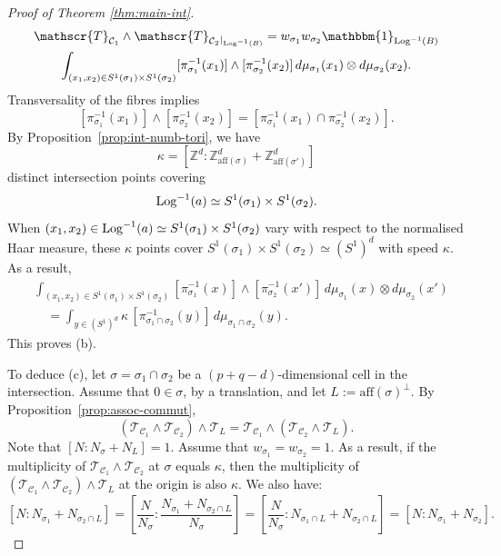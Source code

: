 \documentclass[11pt]{amsart}
\def\Log{{\rm Log}}
\theoremstyle{definition}
\newcommand{\Z}{\mathbb{Z}}
\newcommand{\cC}{\mathcal{C}}
\newcommand{\sT}{\mathscr{T}}
\begin{document}
\begin{proof}[Proof of Theorem \ref{thm:main-int}]
\begin{multline*}
\sT_{\cC_1} \wedge \sT_{\cC_2}{_{|_{\Log^{-1}(B)}}} = w_{\sigma_1} w_{\sigma_2} \mathbbm{1}_{\Log^{-1}(B)} \\ \int_{(x_1,x_2)\in S^1(\sigma_1)\times S^1(\sigma_2)}[\pi_{\sigma_1}^{-1}(x_1)] \wedge [\pi_{\sigma_2}^{-1}(x_2)]\, d\mu_{\sigma_1}(x_1) \otimes d \mu_{\sigma_2}(x_2).
\end{multline*}
Transversality of the fibres implies
$$
[\pi_{\sigma_1}^{-1}(x_1)] \wedge [\pi_{\sigma_2}^{-1}(x_2)] = [\pi_{\sigma_1}^{-1}(x_1) \cap \pi_{\sigma_2}^{-1}(x_2)].
$$
By Proposition~\ref{prop:int-numb-tori}, we have 
\[
\kappa = [\Z^d : \Z^d_{\mathrm{aff}(\sigma)} + \Z^d_{\mathrm{aff}(\sigma')}]
\]
distinct intersection points covering 
\[
\Log^{-1}(a) \simeq S^1(\sigma_1) \times S^1(\sigma_2).
\]
When \((x_1,x_2) \in \Log^{-1}(a) \simeq S^1(\sigma_1) \times S^1(\sigma_2)\) vary with respect to the normalised Haar measure, these \(\kappa\) points cover \(S^1(\sigma_1) \times S^1(\sigma_2) \simeq (S^1)^d\) with speed \(\kappa\). As a result,
\[
\begin{aligned}
&\int_{(x_1,x_2)\in S^1(\sigma_1)\times S^1(\sigma_2)} [\pi_{\sigma_1}^{-1}(x)] \wedge [\pi_{\sigma_2}^{-1}(x')] \, d\mu_{\sigma_1}(x) \otimes d\mu_{\sigma_2}(x') \\
&\quad = \int_{y \in (S^1)^d} \kappa \, [\pi_{\sigma_1 \cap \sigma_2}^{-1}(y)] \, d\mu_{\sigma_1 \cap \sigma_2}(y).
\end{aligned}
\]
This proves (b).

\vskip 2mm
To deduce (c), let \(\sigma = \sigma_1 \cap \sigma_2\) be a \((p + q - d)\)-dimensional cell in the intersection. Assume that \(0 \in \sigma\), by a translation, and let \(L := \mathrm{aff}(\sigma)^{\perp}\). By Proposition~\ref{prop:assoc-commut},
\[
(\sT_{\cC_1} \wedge \sT_{\cC_2}) \wedge \sT_L = \sT_{\cC_1} \wedge (\sT_{\cC_2} \wedge \sT_L).
\]
Note that \([N : N_{\sigma} + N_L] = 1\). Assume that \(w_{\sigma_1} = w_{\sigma_2} = 1\). As a result, if the multiplicity of \(\sT_{\cC_1} \wedge \sT_{\cC_2}\) at \(\sigma\) equals \(\kappa\), then the multiplicity of \((\sT_{\cC_1} \wedge \sT_{\cC_2}) \wedge \sT_L\) at the origin is also \(\kappa\). We also have:
\[
[N : N_{\sigma_1} + N_{\sigma_2 \cap L}] = 
\left[ \frac{N}{N_{\sigma}} : \frac{N_{\sigma_1} + N_{\sigma_2 \cap L}}{N_{\sigma}} \right] = 
\left[ \frac{N}{N_{\sigma}} : N_{\sigma_1 \cap L} + N_{\sigma_2 \cap L} \right] = 
[N : N_{\sigma_1} + N_{\sigma_2}].
\]


\end{proof}
\end{document}
